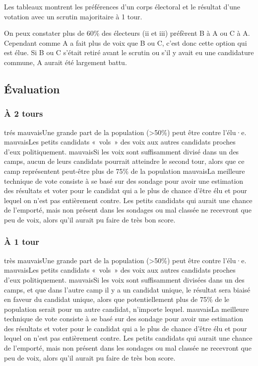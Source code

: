 \documentclass[../report]{subfiles}
\begin{document}
  Les tableaux  montrent les préférences d'un corps 
  électoral et le résultat d'une votation avec un scrutin majoritaire à 1 tour.

  On peux constater plus de 60\% des électeurs (ii et iii) préfèrent B à A ou C à A. 
  Cependant comme A a fait plus de voix que B ou C, c'est donc cette option qui est élue.
  Si B ou C s'était retiré avant le scrutin ou s'il y avait eu une candidature commune, A aurait été largement battu. 

  \subsection{Évaluation}
  \subsubsection{À 2 tours}
  \tabcritere%
    {trés mauvais}{Une grande part de la population (>50\%) peut être contre l'élu·e.}%
    {mauvais}{Les petits candidats «~vols~» des voix aux autres candidats proches d'eux politiquement.}%
    {mauvais}{Si les voix sont suffisamment divisé dans un des camps, aucun de leurs candidats pourrait atteindre le second tour, alors que ce camp représentent peut-être plus de 75\% de la population}%
    {mauvais}{La meilleure technique de vote consiste à se basé sur des sondage pour avoir une estimation des résultats et voter pour le candidat qui a le plus de chance d'être élu et pour lequel on n'est pas entièrement contre. Les petits candidats qui aurait une chance de l'emporté, mais non présent dans les sondages ou mal classée ne recevront que peu de voix, alors qu'il aurait pu faire de très bon score.}

  \subsubsection{À 1 tour}
  \tabcritere%
    {très mauvais}{Une grande part de la population (>50\%) peut être contre l'élu·e.}%
    {mauvais}{Les petits candidats «~vols~» des voix aux autres candidats proches d'eux politiquement.}%
    {mauvais}{Si les voix sont suffisamment divisées dans un des camps, et que dans l'autre camp il y a un candidat unique, le résultat sera biaisé en faveur du candidat unique, alors que potentiellement plus de 75\% de le population serait pour un autre candidat, n'importe lequel.}%
    {mauvais}{La meilleure technique de vote consiste à se basé sur des sondage pour avoir une estimation des résultats et voter pour le candidat qui a le plus de chance d'être élu et pour lequel on n'est pas entièrement contre. Les petits candidats qui aurait une chance de l'emporté, mais non présent dans les sondages ou mal classée ne recevront que peu de voix, alors qu'il aurait pu faire de très bon score.}
    
\end{document}
